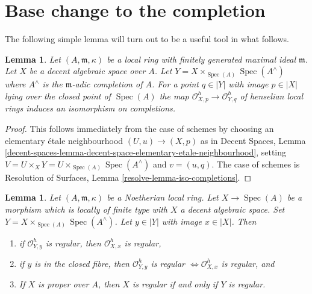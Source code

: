 \documentclass{stacks-project}
\theoremstyle{plain}
\newtheorem{lemma}[subsection]{Lemma}
\theoremstyle{definition}
\theoremstyle{remark}
\numberwithin{equation}{subsection}
\def\Spec{\mathop{\mathrm{Spec}}}
\begin{document}
\section{Base change to the completion}
\label{section-aux}

\noindent
The following simple lemma will turn out to be a useful tool in what follows.

\begin{lemma}
\label{lemma-iso-completions}
Let $(A, \mathfrak m, \kappa)$ be a local ring with finitely generated
maximal ideal $\mathfrak m$. Let $X$ be a decent algebraic
space over $A$. Let $Y = X \times_{\Spec(A)} \Spec(A^\wedge)$ where
$A^\wedge$ is the $\mathfrak m$-adic completion of $A$.
For a point $q \in |Y|$ with image $p \in |X|$ lying
over the closed point of $\Spec(A)$ the map
$\mathcal{O}_{X, p}^h \to \mathcal{O}_{Y, q}^h$
of henselian local rings induces an isomorphism on completions.
\end{lemma}

\begin{proof}
This follows immediately from the case of schemes by
choosing an elementary \'etale neighbourhood $(U, u) \to (X, p)$
as in Decent Spaces, Lemma
\ref{decent-spaces-lemma-decent-space-elementary-etale-neighbourhood},
setting $V = U \times_X Y = U \times_{\Spec(A)} \Spec(A^\wedge)$
and $v = (u, q)$.
The case of schemes is
Resolution of Surfaces, Lemma \ref{resolve-lemma-iso-completions}.
\end{proof}

\begin{lemma}
\label{lemma-port-regularity-to-completion}
Let $(A, \mathfrak m, \kappa)$ be a Noetherian local ring.
Let $X \to \Spec(A)$ be a morphism which is locally of finite type
with $X$ a decent algebraic space. Set
$Y = X \times_{\Spec(A)} \Spec(A^\wedge)$. Let $y \in |Y|$
with image $x \in |X|$. Then
\begin{enumerate}
\item if $\mathcal{O}_{Y, y}^h$ is regular, then
$\mathcal{O}_{X, x}^h$ is regular,
\item if $y$ is in the closed fibre, then $\mathcal{O}_{Y, y}^h$ is regular
$\Leftrightarrow \mathcal{O}_{X, x}^h$ is regular, and
\item If $X$ is proper over $A$, then $X$ is regular
if and only if $Y$ is regular.
\end{enumerate}
\end{lemma}
\end{document}
